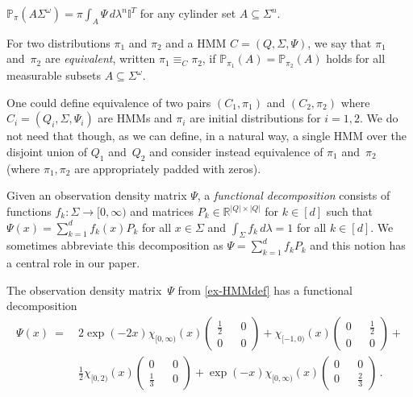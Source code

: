 \documentclass[a4paper,UKenglish,cleveref, autoref,mathscr, amsthm, thmtools, thm-restate]{lipics-v2019}
\newcommand{\RR}{\mathbb{R}}
\newcommand{\PP}{\mathbb{P}}
\newcommand{\1}{\mathbb{I}}
\begin{document}
$\PP_\pi(A \Sigma^\omega) =  \pi \int_A \Psi\, d\lambda^n \1^T$
for any cylinder set $A \subseteq \Sigma^n$.
\begin{definition}
For two distributions $\pi_1$ and $\pi_2$ and a HMM $C = (Q, \Sigma, \Psi)$, we say that $\pi_1$ and~$\pi_2$ are \emph{equivalent}, written $\pi_1 \equiv_C \pi_2$, if $\PP_{\pi_1}(A) = \PP_{\pi_2}(A)$ holds for all measurable subsets $A \subseteq \Sigma^\omega$.
\end{definition}
One could define equivalence of two pairs $(C_1,\pi_1)$ and $(C_2,\pi_2)$ where $C_i = (Q_i, \Sigma, \Psi_i)$ are HMMs and $\pi_i$ are initial distributions for $i=1,2$.
We do not need that though, as we can define, in a natural way, a single HMM over the disjoint union of $Q_1$ and~$Q_2$ and consider instead equivalence of $\pi_1$ and~$\pi_2$ (where $\pi_1,\pi_2$ are appropriately padded with zeros).

Given an observation density matrix $\Psi$, a \emph{functional decomposition} consists of functions $f_k : \Sigma \rightarrow [0,\infty)$ and matrices $P_k \in \RR^{|Q| \times |Q|}$ for $k \in [d]$ such that $\Psi(x) = \sum_{k = 1}^d f_k(x) P_k$ for all $x \in \Sigma$ and $\int_{\Sigma} f_k\, d\lambda = 1$ for all $k \in [d]$. We sometimes abbreviate this decomposition as $\Psi = \sum_{k = 1}^d f_k P_k$ and this notion has a central role in our paper.

\begin{example} \label{ex-functional-decomposition}
The observation density matrix~$\Psi$ from \cref{ex-HMMdef} has a functional decomposition
\begin{align*}
\Psi(x) \ = \
& 2 \exp(-2 x) \chi_{[0,\infty)}(x)
\begin{pmatrix}
\frac12 && 0 \\ 0 && 0
\end{pmatrix}
+
\chi_{[-1,0)}(x)
\begin{pmatrix}
0 && \frac12 \\ 0 && 0
\end{pmatrix}
+ \mbox{} \\
& \frac12 \chi_{[0,2)}(x)
\begin{pmatrix}
0 && 0 \\
\frac13 && 0
\end{pmatrix}
+
\exp(-x) \chi_{[0,\infty)}(x)
\begin{pmatrix}
0 && 0 \\
0 && \frac23
\end{pmatrix}
\,. \tag*{\qed}
\end{align*}
\end{example}
\end{document}
